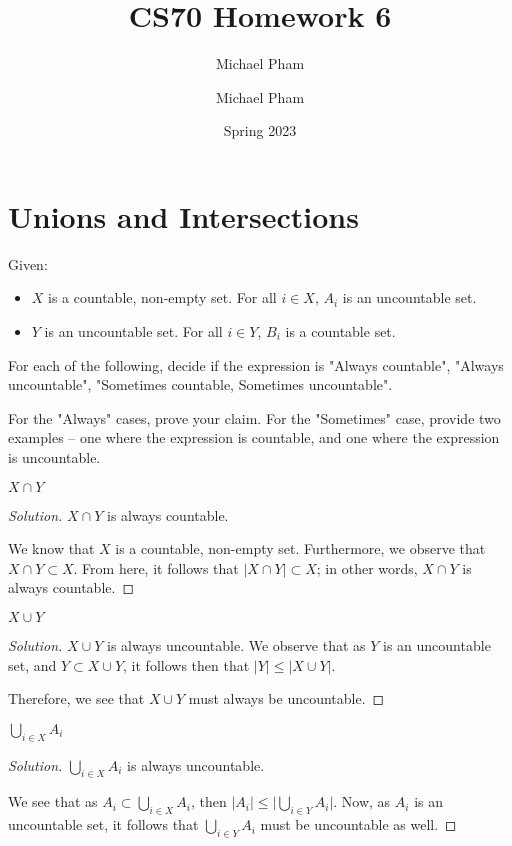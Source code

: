 \documentclass{article}
\title{#1}
\author{Michael Pham}
\date{#2}
\newenvironment{solution}{\begin{proof}[Solution]}{\end{proof}}
\newcommand{\mytitle}[2]{%
	\title{#1}
	\author{Michael Pham}
	\date{#2}
	\maketitle
	\newpage
	\tableofcontents
	\newpage
}
\begin{document}
\mytitle{CS70 Homework 6}{Spring 2023}

\section{Unions and Intersections}
Given:
\begin{itemize}
	\item $X$ is a countable, non-empty set. For all $i \in X$, $A_i$ is an uncountable set.
	\item $Y$ is an uncountable set. For all $i \in Y$, $B_i$ is a countable set.
\end{itemize}

For each of the following, decide if the expression is
"Always countable", "Always uncountable", "Sometimes countable,
Sometimes uncountable".

For the "Always" cases, prove your claim. For the "Sometimes" case, provide
two examples -- one where the expression is countable, and one where
the expression is uncountable.

\begin{hw}
	$X \cap Y$
\end{hw}
\begin{solution}
	$X \cap Y$ is always countable. 
	
	We know that $X$ is a countable, non-empty set. Furthermore, we observe that $X \cap Y \subset X$. From here, it follows that $\lvert X \cap Y \rvert \subset X$; in other words, $X \cap Y$ is always countable.
\end{solution}

\begin{hw}
	$X \cup Y$
\end{hw}
\begin{solution}
	$X \cup Y$ is always uncountable. We observe that as $Y$ is an uncountable set, and $Y \subset X \cup Y$, it follows then that $\lvert Y \rvert \leq \lvert X \cup Y \rvert$.
	
	Therefore, we see that $X \cup Y$ must always be uncountable.
\end{solution}

\begin{hw}
	$\bigcup_{i \in X} A_i$
\end{hw}
\begin{solution}
	$\bigcup_{i \in X} A_{i}$ is always uncountable.
	
	We see that as $A_{i} \subset \bigcup_{i \in X} A_{i}$, then $\lvert A_{i} \rvert \leq \lvert \bigcup_{i \in Y} A_i \rvert$. Now, as $A_{i}$ is an uncountable set, it follows that $\bigcup_{i \in Y} A_{i}$ must be uncountable as well.
\end{solution}
\end{document}
